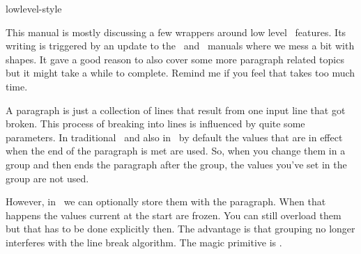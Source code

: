 
\environment lowlevel-style

\startdocument
  [title=paragraphs,
   color=middlecyan]

\startsection[title=Introduction]

This manual is mostly discussing a few wrappers around low level \TEX\ features.
Its writing is triggered by an update to the \METAFUN\ and \LUAMETAFUN\ manuals
where we mess a bit with shapes. It gave a good reason to also cover some more
paragraph related topics but it might take a while to complete. Remind me if you
feel that takes too much time.

\stopsection

\startsection[title=Properties]

A paragraph is just a collection of lines that result from one input line that
got broken. This process of breaking into lines is influenced by quite some
parameters. In traditional \TEX\ and also in \LUAMETATEX\ by default the values
that are in effect when the end of the paragraph is met are used. So, when you
change them in a group and then ends the paragraph after the group, the values
you've set in the group are not used.

However, in \LUAMETATEX\ we can optionally store them with the paragraph. When
that happens the values current at the start are frozen. You can still overload
them but that has to be done explicitly then. The advantage is that grouping no
longer interferes with the line break algorithm. The magic primitive is \type
{\snapshotpar}.

